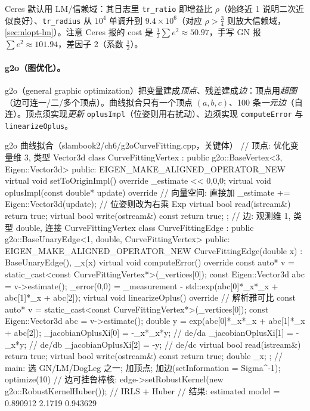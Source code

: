 \noindent Ceres 默认用 LM/信赖域：其日志里 \texttt{tr\_ratio} 即增益比 $\rho$（始终近 1 说明二次近似良好）、\texttt{tr\_radius} 从 $10^4$ 单调升到 $9.4\times10^6$（对应 $\rho>\tfrac34$ 则放大信赖域，\cref{sec:nlopt-lm}）。注意 Ceres 报的 cost 是 $\tfrac12\sum e^2\approx50.97$，手写 GN 报 $\sum e^2\approx101.94$，差因子 2（系数 $\tfrac12$）。

\paragraph{g2o（图优化）。}\cite{gaoxiang2019slam14}
g2o（general graphic optimization）把变量建成\emph{顶点}、残差建成\emph{边}：顶点用\emph{超图}（边可连一/二/多个顶点）。曲线拟合只有一个顶点 $(a,b,c)$、100 条\emph{一元边}（自连）。顶点须实现\emph{更新} \texttt{oplusImpl}（位姿则用右扰动）、边须实现 \texttt{computeError} 与 \texttt{linearizeOplus}。

\begin{codebox}[C++]{g2o 曲线拟合（slambook2/ch6/g2oCurveFitting.cpp，关键体）}
// 顶点: 优化变量维 3, 类型 Vector3d
class CurveFittingVertex : public g2o::BaseVertex<3, Eigen::Vector3d> {
public:
  EIGEN_MAKE_ALIGNED_OPERATOR_NEW
  virtual void setToOriginImpl() override { _estimate << 0,0,0; }
  virtual void oplusImpl(const double* update) override {     // 向量空间: 直接加
    _estimate += Eigen::Vector3d(update);                     // 位姿则改为右乘 Exp
  }
  virtual bool read(istream&) { return true; }
  virtual bool write(ostream&) const { return true; }
};
// 边: 观测维 1, 类型 double, 连接 CurveFittingVertex
class CurveFittingEdge : public g2o::BaseUnaryEdge<1, double, CurveFittingVertex> {
public:
  EIGEN_MAKE_ALIGNED_OPERATOR_NEW
  CurveFittingEdge(double x) : BaseUnaryEdge(), _x(x) {}
  virtual void computeError() override {
    const auto* v = static_cast<const CurveFittingVertex*>(_vertices[0]);
    const Eigen::Vector3d abc = v->estimate();
    _error(0,0) = _measurement - std::exp(abc[0]*_x*_x + abc[1]*_x + abc[2]);
  }
  virtual void linearizeOplus() override {                    // 解析雅可比
    const auto* v = static_cast<const CurveFittingVertex*>(_vertices[0]);
    const Eigen::Vector3d abc = v->estimate();
    double y = exp(abc[0]*_x*_x + abc[1]*_x + abc[2]);
    _jacobianOplusXi[0] = -_x*_x*y;   // de/da
    _jacobianOplusXi[1] = -_x*y;      // de/db
    _jacobianOplusXi[2] = -y;         // de/dc
  }
  virtual bool read(istream&) { return true; }
  virtual bool write(ostream&) const { return true; }
  double _x;
};
// main: 选 GN/LM/DogLeg 之一; 加顶点; 加边(setInformation = Sigma^-1); optimize(10)
// 边可挂鲁棒核: edge->setRobustKernel(new g2o::RobustKernelHuber());  // IRLS + Huber
// 结果: estimated model = 0.890912 2.1719 0.943629
\end{codebox}


